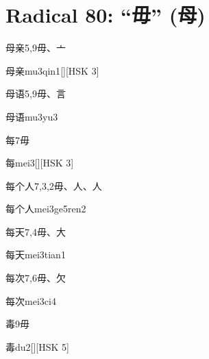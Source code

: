 
\section*{Radical 80: ``⽏'' (母)}

\begin{entry}{母亲}{5,9}{⽏、⼇}
  \begin{phonetics}{母亲}{mu3qin1}[][HSK 3]
  \end{phonetics}
\end{entry}

\begin{entry}{母语}{5,9}{⽏、⾔}
  \begin{phonetics}{母语}{mu3yu3}
  \end{phonetics}
\end{entry}

\begin{entry}{每}{7}{⽏}
  \begin{phonetics}{每}{mei3}[][HSK 3]
  \end{phonetics}
\end{entry}

\begin{entry}{每个人}{7,3,2}{⽏、⼈、⼈}
  \begin{phonetics}{每个人}{mei3ge5ren2}
  \end{phonetics}
\end{entry}

\begin{entry}{每天}{7,4}{⽏、⼤}
  \begin{phonetics}{每天}{mei3tian1}
  \end{phonetics}
\end{entry}

\begin{entry}{每次}{7,6}{⽏、⽋}
  \begin{phonetics}{每次}{mei3ci4}
  \end{phonetics}
\end{entry}

\begin{entry}{毒}{9}{⽏}
  \begin{phonetics}{毒}{du2}[][HSK 5]
  \end{phonetics}
\end{entry}

